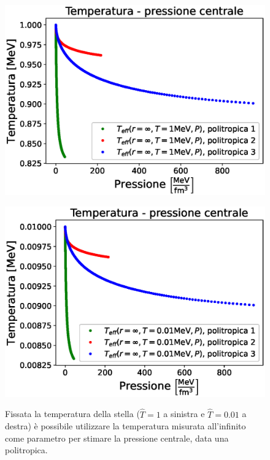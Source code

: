 \documentclass[a4paper, titlepage]{article}
\begin{document}
\begin{figure}[h]
    \begin{minipage}{0.49 \textwidth}
        \centering
        \includegraphics[width = \textwidth]{Figures/Teff1_su_P.eps}
        \label{fig:Teff1_su_P}
    \end{minipage}
    \hspace{0.015 \textwidth}
    \begin{minipage}{0.49 \textwidth}
        \centering
        \includegraphics[width = \textwidth]{Figures/Teff001_su_P.eps}
        \label{fig:Teff001_su_P}
    \end{minipage}
    \caption{Fissata la temperatura della stella ($\hat T = 1$ a sinistra e
    $\hat T = 0.01$ a destra) è possibile utilizzare la temperatura misurata
    all'infinito come parametro per stimare la pressione centrale, data una
    politropica.}
\end{figure}
\end{document}
